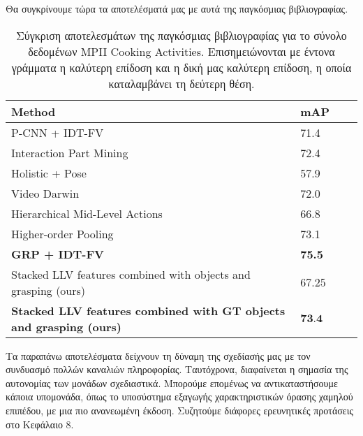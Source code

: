 \documentclass[11pt,a4paper,english,greek,twoside]{../Thesis}
\begin{document}
\par Θα συγκρίνουμε τώρα τα αποτελέσματά μας με αυτά της παγκόσμιας βιβλιογραφίας.

\begin{table}[H]
	\centering
    \begin{tabular}{| l | l | l | l |}
    \hline
    \textbf{Method} & \textbf{mAP} \\ \hline
    P-CNN + IDT-FV \cite{cheron_2015} & 71.4 \\ \hline
    Interaction Part Mining \cite{zhou_2015} & 72.4 \\ \hline
    Holistic + Pose \cite{rohrbach_2012} & 57.9 \\ \hline
    Video Darwin \cite{darwin_2015} & 72.0 \\ \hline
    Hierarchical Mid-Level Actions \cite{su_2016} & 66.8 \\ \hline
    Higher-order Pooling \cite{cherian_2017_higher} & 73.1 \\ \hline
    \textbf{GRP + IDT-FV \cite{cherian_2017}} & \textbf{75.5} \\ \hline
    Stacked LLV features combined with objects and grasping (ours) & 67.25 \\ \hline
    \textbf{Stacked LLV features combined with GT objects and grasping (ours)} & $\textbf{73.4}$ \\
    \hline
    \end{tabular}
	\label{tab:CompareResults}
	\caption{Σύγκριση αποτελεσμάτων της παγκόσμιας βιβλιογραφίας για το σύνολο δεδομένων MPII Cooking Activities. Επισημειώνονται με έντονα γράμματα η καλύτερη επίδοση \cite{cherian_2017} και η δική μας καλύτερη επίδοση, η οποία καταλαμβάνει τη δεύτερη θέση.}
\end{table}

Τα παραπάνω αποτελέσματα δείχνουν τη δύναμη της σχεδίασής μας με τον συνδυασμό πολλών καναλιών πληροφορίας. Ταυτόχρονα, διαφαίνεται η σημασία της αυτονομίας των μονάδων σχεδιαστικά. Μπορούμε επομένως να αντικαταστήσουμε κάποια υπομονάδα, όπως το υποσύστημα εξαγωγής χαρακτηριστικών όρασης χαμηλού επιπέδου, με μια πιο ανανεωμένη έκδοση. Συζητούμε διάφορες ερευνητικές προτάσεις στο Κεφάλαιο 8.
\end{document}
